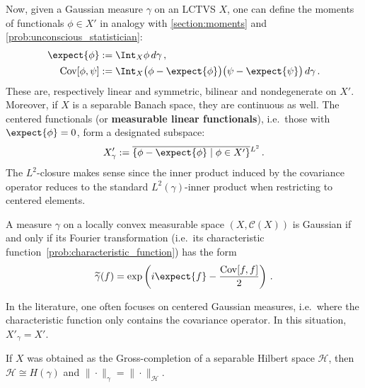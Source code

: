     Now, given a Gaussian measure $\gamma$ on an LCTVS $X$, one can define the moments of functionals $\phi\in X'$ in analogy with \cref{section:moments} and \cref{prob:unconscious_statistician}:
    \begin{gather}
        \begin{aligned}
            \expect{\phi} &:= \Int_X\phi\,d\gamma\,,\\
            \mathrm{Cov}[\phi,\psi] &:= \Int_X\bigl(\phi-\expect{\phi}\bigr)\bigl(\psi-\expect{\psi}\bigr)\,d\gamma\,.
        \end{aligned}
    \end{gather}
    These are, respectively linear and symmetric, bilinear and nondegenerate on $X'$. Moreover, if $X$ is a separable Banach space, they are continuous as well. The centered functionals (or \textbf{measurable linear functionals}), i.e.~those with $\expect{\phi}=0$, form a designated subspace:
    \begin{gather}
        X'_\gamma := \overline{\{\phi-\expect{\phi}\mid\phi\in X'\}}\vphantom{\expect{\phi}}^{L^2}\,.
    \end{gather}
    The $L^2$-closure makes sense since the inner product induced by the covariance operator reduces to the standard $L^2(\gamma)$-inner product when restricting to centered elements.

    \begin{theorem}
        A measure $\gamma$ on a locally convex measurable space $(X,\mathcal{C}(X))$ is Gaussian if and only if its Fourier transformation (i.e.~its characteristic function~\ref{prob:characteristic_function}) has the form
        \begin{gather}
            \widetilde{\gamma}(f) = \exp\left(i\expect{f} - \frac{\mathrm{Cov}[f,f]}{2}\right)\,.
        \end{gather}
    \end{theorem}
    \begin{remark}
        In the literature, one often focuses on centered Gaussian measures, i.e.~where the characteristic function only contains the covariance operator. In this situation, $X'_\gamma=X'$.
    \end{remark}

    \begin{remark}
        If $X$ was obtained as the Gross-completion of a separable Hilbert space $\mathcal{H}$, then $\mathcal{H}\cong H(\gamma)$ and $\|\cdot\|_\gamma=\|\cdot\|_{\mathcal{H}}$.
    \end{remark}

